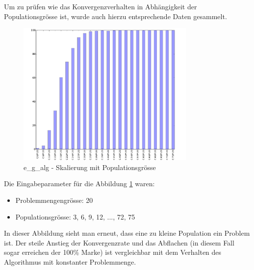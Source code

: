 Um zu prüfen wie das Konvergenzverhalten in Abhängigkeit der Populationsgrösse ist, wurde auch hierzu entsprechende Daten gesammelt.
\begin{figure}[H]
  \centering
  \includegraphics[width=0.78\textwidth]{images/E_G_CS_div5CS_solved.pdf}
  \caption[\Gls{e_g_alg} - Skalierung mit Populationsgrösse]{\Gls{e_g_alg} - Skalierung mit Populationsgrösse}
  \label{fig:e_g_cs_div5}
\end{figure}
\clearpage
Die Eingabeparameter für die Abbildung \ref{fig:e_g_cs_div5} waren:
\begin{itemize}
	\item Problemmengengrösse: 20
	\item Populationsgrösse: 3, 6, 9, 12, ..., 72, 75
\end{itemize}

In dieser Abbildung sieht man erneut, dass eine zu kleine Population ein Problem ist. Der steile Anstieg der Konvergenzrate und das Abflachen (in diesem Fall sogar erreichen der 100\% Marke) ist vergleichbar mit dem Verhalten des Algorithmus mit konstanter Problemmenge.